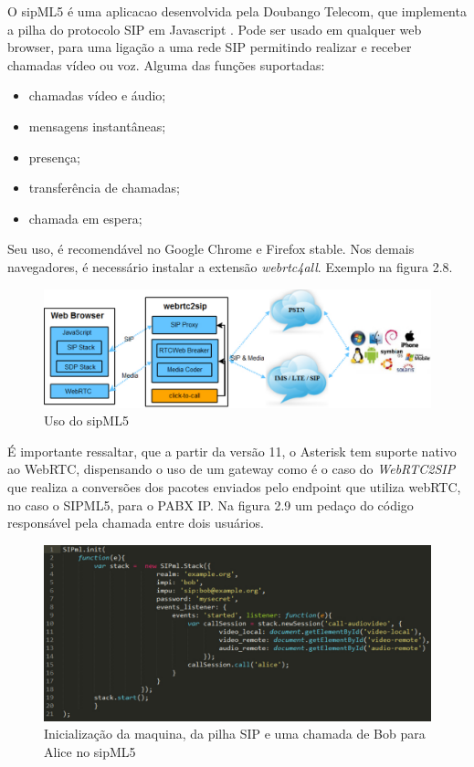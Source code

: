 \documentclass[12pt,a4paper,oneside]{report}
\begin{document}
O sipML5 é uma aplicacao desenvolvida pela Doubango Telecom, que implementa a pilha do protocolo SIP em Javascript \cite{Borges:2013}. Pode ser usado em qualquer web browser, para uma ligação a uma rede SIP permitindo realizar e receber chamadas vídeo ou voz. Alguma das funções suportadas:

\begin{itemize} %
 \item chamadas vídeo e áudio;
 \item mensagens instantâneas;
 \item presença;
 \item transferência de chamadas;
 \item chamada em espera;
\end{itemize}

Seu uso, é recomendável no Google Chrome e Firefox stable. Nos demais navegadores, é necessário instalar a extensão \textit{webrtc4all}. Exemplo na figura 2.8.

\begin{figure}[!htdb]
 \centering
  \includegraphics[width = 1\linewidth]{images/sipml5}
  \caption{Uso do sipML5} %
  \label{f_mediaStream}
\end{figure}

É importante ressaltar, que a partir da versão 11, o Asterisk tem suporte nativo ao WebRTC, dispensando o uso de um gateway como é o caso do \textit{WebRTC2SIP} que realiza a conversões dos pacotes enviados pelo endpoint que utiliza webRTC, no caso o SIPML5, para o PABX IP. Na figura 2.9 um pedaço do código responsável pela chamada entre dois usuários.


\begin{figure}[!htdb]
 \centering
  \includegraphics[width = 1\linewidth]{images/sipml5code}
  \caption{Inicialização da maquina, da pilha SIP e uma chamada de Bob para Alice no sipML5} %
  \label{f_mediaStream}
\end{figure}
\end{document}
